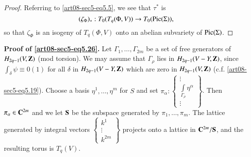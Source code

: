 \begin{proof}
Referring to \eqref{art08-sec5-eq5.5}, we see that $\tau^{*}$ is
$$
(\zeta_{\Phi})_{*}:T_{0}(T_{q}(\Phi,V))\to T_{0}(\operatorname{\mathrm{Pic}}(\Sigma)),
$$
so that $\zeta_{\Phi}$ is an isogeny of $T_{q}(\Phi,V)$ onto an abelian subvariety of $\operatorname{\mathrm{Pic}}(\Sigma)$.
\end{proof}

\noindent
{\bf Proof of \eqref{art08-sec5-eq5.26}.} Let $\Gamma_{1},\ldots,\Gamma_{2m}$ be a set of free generators of $H_{2q-1}(V,\mathbf{Z})$ (mod torsion). We may assume that $\Gamma_{\rho}$ lies in $H_{2q-1}(V-Y,\mathbf{Z})$, since $\int_{\delta}\psi\equiv 0(1)$ for all $\delta$ in $H_{2q-1}(V-Y,\mathbf{Z})$ which are zero in $H_{2q-1}(V,\mathbf{Z})$ (c.f. \eqref{art08-sec5-eq5.19}). Choose a basis $\eta^{1},\ldots,\eta^{m}$ for $S$ and set $\pi_{\alpha}:\left\{\begin{smallmatrix} \vdots\\ \int\limits_{\Gamma_{\rho}}\eta^{\alpha}\\ \vdots\end{smallmatrix}\right\}$. Then $\pi_{\alpha}\in \mathbf{C}^{2m}$ and we let $\mathbf{S}$ be the subspace generated by $\pi_{1},\ldots,\pi_{m}$. The lattice generated by integral vectors $\left\{\begin{smallmatrix} k^{1} \\ \vdots\\ k^{2m}\end{smallmatrix}\right\}$ projects onto a lattice in $\mathbf{C}^{2m}/\mathbf{S}$, and the resulting torus is $T_{q}(V)$.


